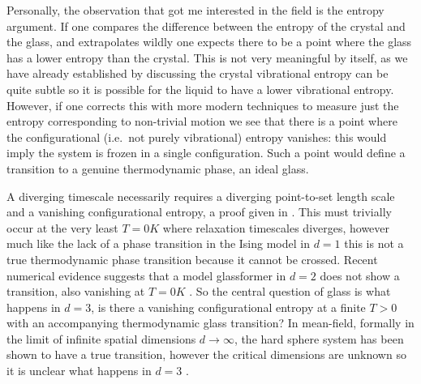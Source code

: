 \documentclass[11pt]{report}
\begin{document}
Personally, the observation that got me interested in the field is the entropy argument.
If one compares the difference between the entropy of the crystal and the glass, and extrapolates wildly one expects there to be a point where the glass has a lower entropy than the crystal.
This is not very meaningful by itself, as we have already established by discussing the crystal vibrational entropy can be quite subtle so it is possible for the liquid to have a lower vibrational entropy.
However, if one corrects this with more modern techniques to measure just the entropy corresponding to non-trivial motion we see that there is a point where the configurational (i.e.\ not purely vibrational) entropy vanishes: this would imply the system is frozen in a single configuration.
Such a point would define a transition to a genuine thermodynamic phase, an ideal glass.

A diverging timescale necessarily requires a diverging point-to-set length scale and a vanishing configurational entropy, a proof given in \cite{?}.
This must trivially occur at the very least $T=0\si{K}$ where relaxation timescales diverges, however much like the lack of a phase transition in the Ising model in $d=1$ this is not a true thermodynamic phase transition because it cannot be crossed.
Recent numerical evidence suggests that a model glassformer in $d=2$ does not show a transition, also vanishing at $T=0\si{K}$ \cite{Berthier?}.
So the central question of glass is what happens in $d=3$, is there a vanishing configurational entropy at a finite $T > 0$ with an accompanying thermodynamic glass transition?
In mean-field, formally in the limit of infinite spatial dimensions $d \to \infty$, the hard sphere system has been shown to have a true transition, however the critical dimensions are unknown so it is unclear what happens in $d=3$ \cite{Parisi,Zamboni,Charbonneau,Kurchan,?,?}.

\end{document}
